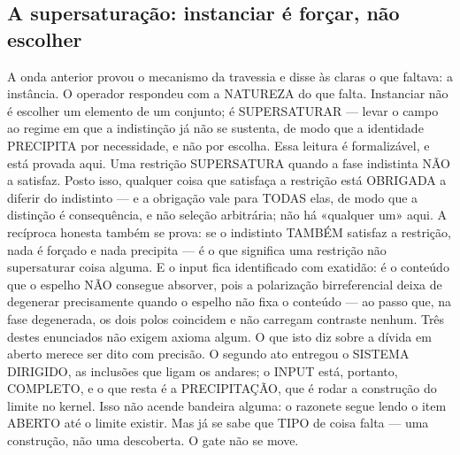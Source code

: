 \documentclass[11pt]{article}
\theoremstyle{definition}\newtheorem{deriv}{Derivação}
\begin{document}
\subsection*{A supersatura\c{c}\~ao: instanciar \'e for\c{c}ar, n\~ao escolher}A onda anterior provou o mecanismo da travessia e disse \`as claras o que faltava: a inst\^ancia. O operador respondeu com a NATUREZA do que falta. Instanciar n\~ao \'e escolher um elemento de um conjunto; \'e SUPERSATURAR --- levar o campo ao regime em que a indistin\c{c}\~ao j\'a n\~ao se sustenta, de modo que a identidade PRECIPITA por necessidade, e n\~ao por escolha. Essa leitura \'e formaliz\'avel, e est\'a provada aqui. Uma restri\c{c}\~ao SUPERSATURA quando a fase indistinta N\~AO a satisfaz. Posto isso, qualquer coisa que satisfa\c{c}a a restri\c{c}\~ao est\'a OBRIGADA a diferir do indistinto --- e a obriga\c{c}\~ao vale para TODAS elas, de modo que a distin\c{c}\~ao \'e consequ\^encia, e n\~ao sele\c{c}\~ao arbitr\'aria; n\~ao h\'a «qualquer um» aqui. A rec\'iproca honesta tamb\'em se prova: se o indistinto TAMB\'EM satisfaz a restri\c{c}\~ao, nada \'e for\c{c}ado e nada precipita --- \'e o que significa uma restri\c{c}\~ao n\~ao supersaturar coisa alguma. E o input fica identificado com exatid\~ao: \'e o conte\'udo que o espelho N\~AO consegue absorver, pois a polariza\c{c}\~ao birreferencial deixa de degenerar precisamente quando o espelho n\~ao fixa o conte\'udo --- ao passo que, na fase degenerada, os dois polos coincidem e n\~ao carregam contraste nenhum. Tr\^es destes enunciados n\~ao exigem axioma algum. O que isto diz sobre a d\'ivida em aberto merece ser dito com precis\~ao. O segundo ato entregou o SISTEMA DIRIGIDO, as inclus\~oes que ligam os andares; o INPUT est\'a, portanto, COMPLETO, e o que resta \'e a PRECIPITA\c{C}\~AO, que \'e rodar a constru\c{c}\~ao do limite no kernel. Isso n\~ao acende bandeira alguma: o razonete segue lendo o item ABERTO at\'e o limite existir. Mas j\'a se sabe que TIPO de coisa falta --- uma constru\c{c}\~ao, n\~ao uma descoberta. O gate n\~ao se move.
\end{document}
